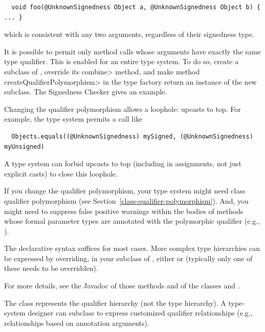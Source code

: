 \begin{Verbatim}
  void foo(@UnknownSignedness Object a, @UnknownSignedness Object b) { ... }
\end{Verbatim}

\noindent
which is consistent with any two arguments, regardless of their signedness
type.

It is possible to permit only method calls whose arguments have exactly the
same type qualifier.  This is enabled for an entire type system.  To do so,
create a subclass of
, override its
\<combine> method, and make method \<createQualifierPolymorphism> in the
type factory return an instance of the new subclass.  The Signedness
Checker gives an example.

Changing the qualifier polymorphism allows a loophole:  upcasts to top.
For example, the type system permits a call like

\begin{Verbatim}
  Objects.equals((@UnknownSignedness) mySigned, (@UnknownSignedness) myUnsigned)
\end{Verbatim}

\noindent
A type system can forbid upcasts to top (including in assignments, not just
explicit casts) to close this loophole.

If you change the qualifier polymorphism, your type system might need class
qualifier polymorphism (see Section~\ref{class-qualifier-polymorphism}).
And, you might need to suppress
false positive warnings within the bodies of methods whose formal parameter
types are annotated with the polymorphic qualifier (e.g.,
).



The declarative syntax suffices for most cases.  More complex type
hierarchies can be expressed by overriding, in your subclass of
, either
or 
(typically only one of these needs to be overridden).

For more details, see the Javadoc of those methods and of the classes
 and .

The  class represents the qualifier hierarchy (not the
type hierarchy).  A type-system designer can subclass
 to express customized qualifier
relationships (e.g., relationships based on annotation
arguments).

